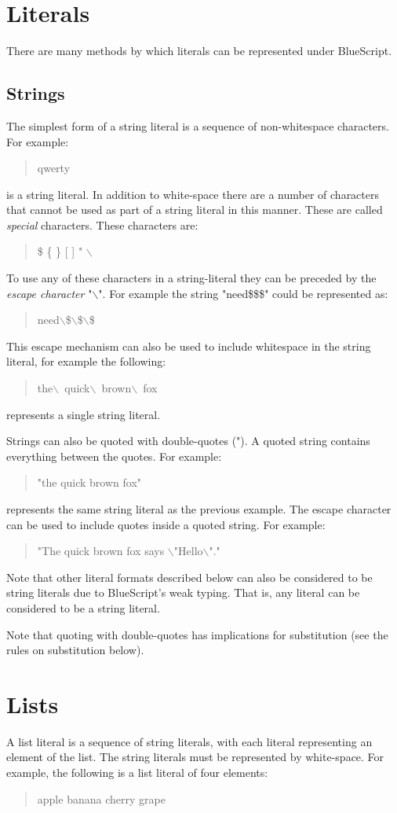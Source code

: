 \documentclass[10pt]{book}
\newcommand{\Example}[1]{{\begin{quote} \colorbox{lgray}{\parbox{5in}{\ttfamily #1}} \end{quote}}}
\newcommand{\bs}[0]{$\backslash$}
\begin{document}
\section{Literals}

There are many methods by which literals can be represented under BlueScript.

\subsection{Strings}

The simplest form of a string literal is a sequence of non-whitespace characters.  For example:
\Example{qwerty}
\noindent is a string literal.  In addition to white-space there are a number of characters that cannot be used as part of a string literal in this manner.  These are called {\em special} characters.  These characters are:
\Example{\$ \{ \} [ ] " \bs}
To use any of these characters in a string-literal they can be preceded by the {\em escape character} "\bs".  For example the string "need\$\$\$" could be represented as:
\Example{need\bs\$\bs\$\bs\$}
This escape mechanism can also be used to include whitespace in the string literal, for example the following:
\Example{the\bs\ quick\bs\ brown\bs\ fox}
\noindent represents a single string literal.

Strings can also be quoted with double-quotes (").  A quoted string contains everything between the quotes.  For example:
\Example{"the quick brown fox"}
\noindent represents the same string literal as the previous example.  The escape character can be used to include quotes inside a quoted string.  For example:
\Example{"The quick brown fox says \bs"Hello\bs"."}

Note that other literal formats described below can also be considered to be string literals due to BlueScript's weak typing.  That is, any literal can be considered to be a string literal.

Note that quoting with double-quotes has implications for substitution (see the rules on substitution below).

\section{Lists}

A list literal is a sequence of string literals, with each literal representing an element of the list.  The string literals must be represented by white-space.  For example, the following is a list literal of four elements:
\Example{apple banana cherry grape}
\end{document}
